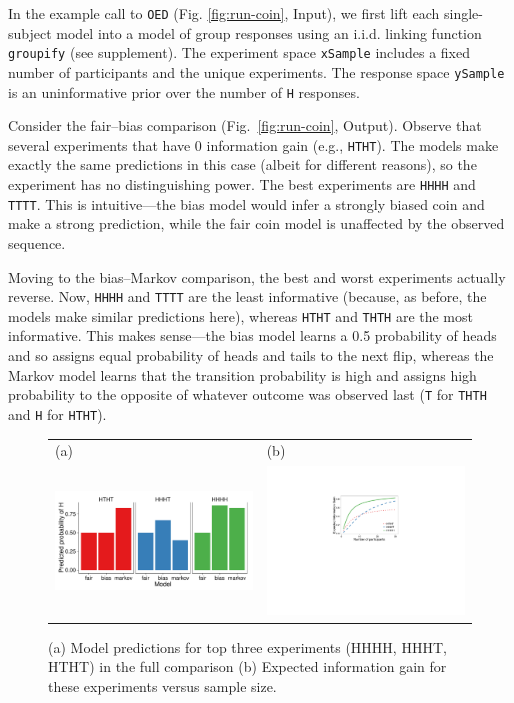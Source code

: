 \documentclass{article}
\begin{document}
In the example call to \lstinline{OED} (Fig. \ref{fig:run-coin}, Input), we first lift each single-subject model into a model of group responses using an i.i.d. linking function \lstinline{groupify} (see supplement).
The experiment space \lstinline{xSample} includes a fixed number of participants and the unique experiments.
The response space \lstinline{ySample} is an uninformative prior over the number of \lstinline{H} responses.

Consider the fair--bias comparison (Fig.~\ref{fig:run-coin}, Output).
Observe that several experiments that have 0 information gain (e.g., \lstinline{HTHT}).
The models make exactly the same predictions in this case (albeit for different reasons), so the experiment has no distinguishing power.
The best experiments are \lstinline{HHHH} and \lstinline{TTTT}.
This is intuitive---the bias model would infer a strongly biased coin and make a strong prediction, while the fair coin model is unaffected by the observed sequence.

Moving to the bias--Markov comparison, the best and worst experiments actually reverse.
Now, \lstinline{HHHH} and \lstinline{TTTT} are the least informative (because, as before, the models make similar predictions here), whereas \lstinline{HTHT} and \lstinline{THTH} are the most informative.
This makes sense---the bias model learns a 0.5 probability of heads and so assigns equal probability of heads and tails to the next flip, whereas the Markov model learns that the transition probability is high and assigns high probability to the opposite of whatever outcome was observed last (\lstinline{T} for \lstinline{THTH} and \lstinline{H} for \lstinline{HTHT}).

\begin{figure}[h]
  \centering
  \begin{tabular}{l l}
    (a) & (b)\\
    \includegraphics[width=0.6\columnwidth]{img/coin_predictions.pdf} &
                                                                        \includegraphics[width=0.4\columnwidth]{img/coin_eig_3way_nsubj_wlegend.pdf} \\
  \end{tabular}
  \caption{(a) Model predictions for top three experiments (HHHH, HHHT, HTHT) in the full comparison (b) Expected information gain for these experiments versus sample size.}
  \label{fig:coin_preds}
\end{figure}
\end{document}
